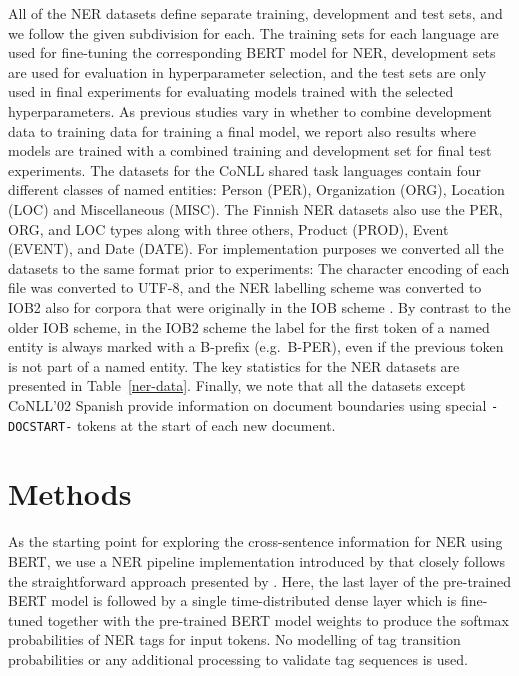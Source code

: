 All of the NER datasets define separate training, development and test sets, and we follow the given subdivision for each. The training sets for each language are used for fine-tuning the corresponding BERT model for NER, development sets are used for evaluation in hyperparameter selection, and the test sets are only used in final experiments for evaluating models trained with the selected hyperparameters. As previous studies vary in whether to combine development data to training data for training a final model, we report also results where models are trained with a combined training and development set for final test experiments.
The datasets for the CoNLL shared task languages contain four different classes of named entities: Person (PER), Organization (ORG), Location (LOC) and Miscellaneous (MISC). The Finnish NER datasets also use the PER, ORG, and LOC types along with three others, Product (PROD), Event (EVENT), and Date (DATE). For implementation purposes we converted all the datasets to the same format prior to experiments: The character encoding of each file was converted to UTF-8, and the NER labelling scheme was converted to IOB2 \cite{ratnaparkhi1998maximum} also for corpora that were originally in the IOB scheme \cite{ramshaw-marcus-1995-text}. By contrast to the older IOB scheme, in the IOB2 scheme the label for the first token of a named entity is always marked with a B-prefix (e.g.\ B-PER), even if the previous token is not part of a named entity.
The key statistics for the NER datasets are presented in Table~\ref{ner-data}. Finally, we note that all the datasets except CoNLL'02 Spanish provide information on document boundaries using special \texttt{-DOCSTART-} tokens at the start of each new document.

\section{Methods}
\label{sec:methods}

As the starting point for exploring the cross-sentence information for NER using BERT, we use a NER pipeline implementation introduced by  that closely follows the straightforward approach presented by . Here, the last layer of the pre-trained BERT model is followed by a single time-distributed dense layer which is fine-tuned together with the pre-trained BERT model weights to produce the softmax probabilities of NER tags for input tokens. No modelling of tag transition probabilities or any additional processing to validate tag sequences is used.

